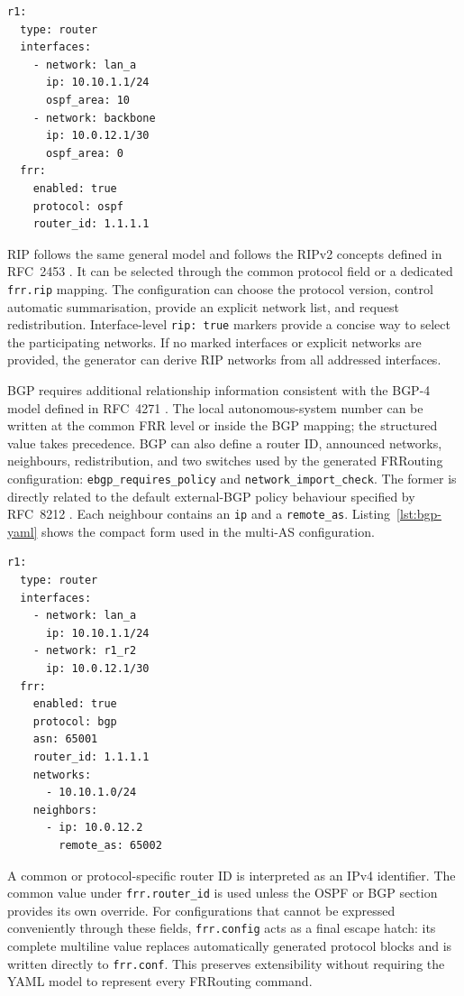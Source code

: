 \begin{lstlisting}[caption={Interface-level OSPF area configuration.},label={lst:ospf-yaml}]
r1:
  type: router
  interfaces:
    - network: lan_a
      ip: 10.10.1.1/24
      ospf_area: 10
    - network: backbone
      ip: 10.0.12.1/30
      ospf_area: 0
  frr:
    enabled: true
    protocol: ospf
    router_id: 1.1.1.1
\end{lstlisting}

RIP follows the same general model and follows the RIPv2 concepts defined in
RFC~2453 \cite{rfc2453}. It can be selected through the common
protocol field or a dedicated \texttt{frr.rip} mapping. The configuration can
choose the protocol version, control automatic summarisation, provide an
explicit network list, and request redistribution. Interface-level
\texttt{rip: true} markers provide a concise way to select the participating
networks. If no marked interfaces or explicit networks are provided, the
generator can derive RIP networks from all addressed interfaces.

BGP requires additional relationship information consistent with the BGP-4
model defined in RFC~4271 \cite{rfc4271}. The local autonomous-system
number can be written at the common FRR level or inside the BGP mapping; the
structured value takes precedence. BGP can also define a router ID, announced
networks, neighbours, redistribution, and two switches used by the generated
FRRouting configuration: \texttt{ebgp\_requires\_policy} and
\texttt{network\_import\_check}. The former is directly related to the
default external-BGP policy behaviour specified by RFC~8212
\cite{rfc8212}. Each neighbour contains an \texttt{ip} and a
\texttt{remote\_as}. Listing~\ref{lst:bgp-yaml} shows the compact form used in
the multi-AS configuration.

\begin{lstlisting}[caption={BGP node declaration.},label={lst:bgp-yaml}]
r1:
  type: router
  interfaces:
    - network: lan_a
      ip: 10.10.1.1/24
    - network: r1_r2
      ip: 10.0.12.1/30
  frr:
    enabled: true
    protocol: bgp
    asn: 65001
    router_id: 1.1.1.1
    networks:
      - 10.10.1.0/24
    neighbors:
      - ip: 10.0.12.2
        remote_as: 65002
\end{lstlisting}

A common or protocol-specific router ID is interpreted as an IPv4 identifier.
The common value under \texttt{frr.router\_id} is used unless the OSPF or BGP
section provides its own override. For configurations that cannot be expressed
conveniently through these fields, \texttt{frr.config} acts as a final escape
hatch: its complete multiline value replaces automatically generated protocol
blocks and is written directly to \texttt{frr.conf}. This preserves
extensibility without requiring the YAML model to represent every FRRouting
command.

